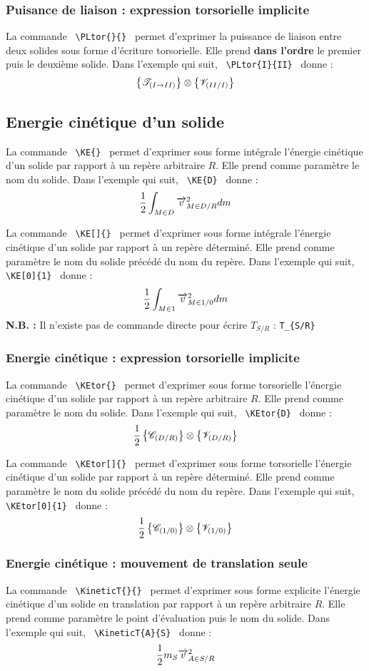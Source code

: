 \documentclass[12pt]{article}
\begin{document}
\subsubsection{Puisance de liaison : expression torsorielle implicite}
La commande \verb| \PLtor{}{} | permet d'exprimer la puissance de liaison entre deux solides sous forme d'écriture torsorielle. Elle prend \textbf{dans l'ordre} le premier puis le deuxième solide. Dans l'exemple qui suit, \verb| \PLtor{I}{II} | donne : $$\PLtor{I}{II}$$

\subsection{Energie cinétique d'un solide}
La commande \verb| \KE{} | permet d'exprimer sous forme intégrale l'énergie cinétique d'un solide par rapport à un repère arbitraire $R$. Elle prend comme paramètre le nom du solide. Dans l'exemple qui suit, \verb| \KE{D} | donne : $$\KE{D}$$

La commande \verb| \KE[]{} | permet d'exprimer sous forme intégrale l'énergie cinétique d'un solide par rapport à un repère déterminé. Elle prend comme paramètre le nom du solide précédé du nom du repère. Dans l'exemple qui suit, \verb| \KE[0]{1} | donne : $$\KE[0]{1}$$
\textbf{N.B. :} Il n'existe pas de commande directe pour écrire $T_{S/R}$ : \verb|T_{S/R}|

\subsubsection{Energie cinétique : expression torsorielle implicite}
La commande \verb| \KEtor{} | permet d'exprimer sous forme torsorielle l'énergie cinétique d'un solide par rapport à un repère arbitraire $R$. Elle prend comme paramètre le nom du solide. Dans l'exemple qui suit, \verb| \KEtor{D} | donne : $$\KEtor{D}$$

La commande \verb| \KEtor[]{} | permet d'exprimer sous forme torsorielle l'énergie cinétique d'un solide par rapport à un repère déterminé. Elle prend comme paramètre le nom du solide précédé du nom du repère. Dans l'exemple qui suit, \verb| \KEtor[0]{1} | donne : $$\KEtor[0]{1}$$

\subsubsection{Energie cinétique : mouvement de translation seule}
La commande \verb| \KineticT{}{} | permet d'exprimer sous forme explicite l'énergie cinétique d'un solide en translation par rapport à un repère arbitraire $R$. Elle prend comme paramètre le point d'évaluation puis le nom du solide. Dans l'exemple qui suit, \verb| \KineticT{A}{S} | donne : $$\KineticT{A}{S}$$
\end{document}
